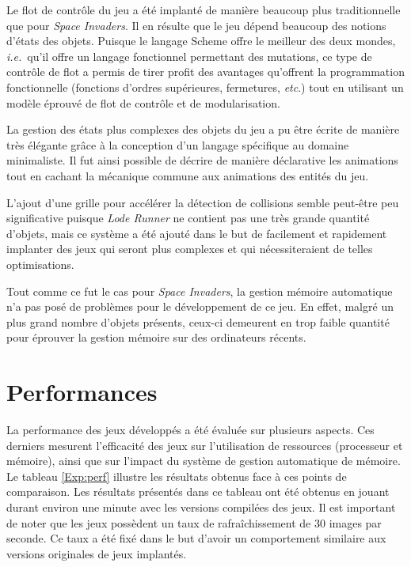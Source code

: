 \documentclass[12pt,twoside,letterpaper,francais]{book}
\newcommand{\ie}{{\textit{i.e.}~}}
\begin{document}
Le flot de contrôle du jeu a été implanté de manière beaucoup plus
traditionnelle que pour \textit{Space Invaders}. Il en résulte que le jeu dépend beaucoup
des notions d'états des objets. Puisque le langage Scheme offre
le meilleur des deux mondes, \ie qu'il offre un langage fonctionnel
permettant des mutations, ce type de contrôle de flot a permis de
tirer profit des avantages qu'offrent la programmation fonctionnelle
(fonctions d'ordres supérieures, fermetures, \textit{etc}.) tout en utilisant
un modèle éprouvé de flot de contrôle et de modularisation.

La gestion des états plus complexes des objets du jeu a pu être écrite
de manière très élégante grâce à la conception d'un langage spécifique
au domaine minimaliste. Il fut ainsi possible de décrire de manière
déclarative les animations tout en cachant la mécanique commune aux
animations des entités du jeu.

L'ajout d'une grille pour accélérer la détection de collisions semble
peut-être peu significative puisque \textit{Lode Runner} ne contient pas une très
grande quantité d'objets, mais ce système a été ajouté dans le but de
facilement et rapidement implanter des jeux qui seront plus complexes
et qui nécessiteraient de telles optimisations.

Tout comme ce fut le cas pour \textit{Space Invaders}, la gestion
mémoire automatique n'a pas posé de problèmes pour le dévelop\-pement
de ce jeu. En effet, malgré un plus grand nombre d'objets présents,
ceux-ci demeurent en trop faible quantité pour éprouver la gestion
mémoire sur des ordinateurs récents.

\FloatBarrier
\section{Performances}
La performance des jeux développés a été évaluée sur plusieurs
aspects. Ces derniers mesurent l'efficacité des jeux sur l'utilisation
de ressources (processeur et mémoire), ainsi que sur l'impact du
système de gestion automatique de mémoire. Le tableau \ref{Exp:perf}
illustre les résultats obtenus face à ces points de comparaison. Les
résultats présentés dans ce tableau ont été obtenus en jouant durant
environ une minute avec les versions compilées des jeux. Il est
important de noter que les jeux possèdent un taux de rafraîchissement
de 30 images par seconde. Ce taux a été fixé dans le but d'avoir un
comportement similaire aux versions originales de jeux implantés.
\end{document}
